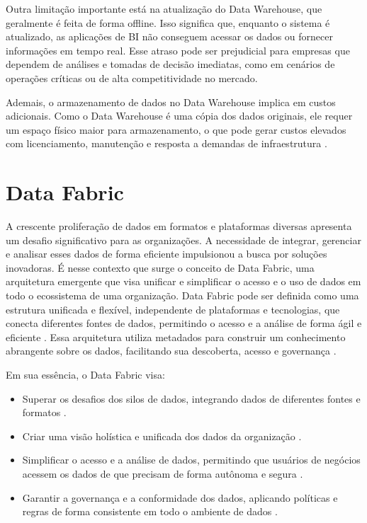 Outra limitação importante está na atualização do Data Warehouse, que geralmente é feita de forma offline. Isso significa que, enquanto o sistema 
é atualizado, as aplicações de BI não conseguem acessar os dados ou fornecer informações em tempo real. Esse atraso pode ser prejudicial para empresas 
que dependem de análises e tomadas de decisão imediatas, como em cenários de operações críticas ou de alta competitividade no mercado.

Ademais, o armazenamento de dados no Data Warehouse implica em custos adicionais. Como o Data Warehouse é uma cópia dos dados originais, ele requer um 
espaço físico maior para armazenamento, o que pode gerar custos elevados com licenciamento, manutenção e resposta a demandas de infraestrutura \cite{mousa2015data}. 

\section{Data Fabric}

A crescente proliferação de dados em formatos e plataformas diversas apresenta um desafio significativo para as organizações. A necessidade de integrar, gerenciar e
analisar esses dados de forma eficiente impulsionou a busca por soluções inovadoras. É nesse contexto que surge o conceito de Data Fabric, uma arquitetura emergente 
que visa unificar e simplificar o acesso e o uso de dados em todo o ecossistema de uma organização.
Data Fabric pode ser definida como uma estrutura unificada e flexível, independente de plataformas e tecnologias, que conecta diferentes fontes de dados, permitindo 
o acesso e a análise de forma ágil e eficiente \cite{gade2024data}. Essa arquitetura utiliza metadados para construir um conhecimento abrangente sobre os dados, 
facilitando sua descoberta, acesso e governança \cite{barik2022data}.

Em sua essência, o Data Fabric visa:
\begin{itemize}
    \item Superar os desafios dos silos de dados, integrando dados de diferentes fontes e formatos \cite{gade2024data}.
    \item Criar uma visão holística e unificada dos dados da organização \cite{barik2022data}.
    \item Simplificar o acesso e a análise de dados, permitindo que usuários de negócios acessem os dados de que precisam de forma autônoma e segura \cite{gade2024data}.
    \item Garantir a governança e a conformidade dos dados, aplicando políticas e regras de forma consistente em todo o ambiente de dados \cite{gade2024data}.
\end{itemize}

